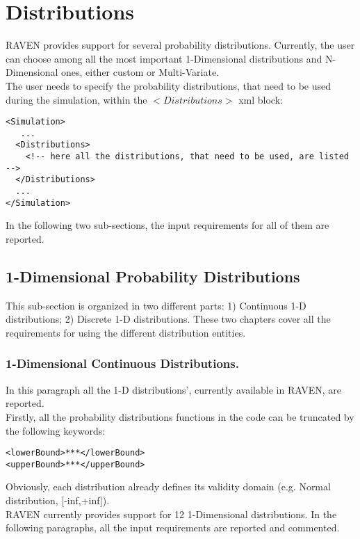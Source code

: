 \section{Distributions \\ \vspace{2 mm}}
\label{sec:distributions}
\newcommand{\distname}[1]{\textbf{#1}}
\newcommand{\distattrib}[1]{\textit{#1}}
RAVEN provides support for several probability distributions. Currently, the user can choose among all the most important 1-Dimensional distributions and N-Dimensional ones, either custom or Multi-Variate.  
\\ The user needs to specify the probability distributions, that need to be used during the simulation, within the $<Distributions>$ xml block:
\begin{lstlisting}[style=XML]
<Simulation>
   ...
  <Distributions>
    <!-- here all the distributions, that need to be used, are listed -->
  </Distributions>
  ...
</Simulation>
\end{lstlisting}
In the following two sub-sections, the input requirements for all of them are reported.
\subsection{1-Dimensional Probability Distributions}
\label{subsec:1dDist}

This sub-section is organized in two different parts: 1) Continuous 1-D distributions; 2) Discrete 1-D distributions. These two chapters cover all the  requirements for using the different distribution entities. 
\subsubsection{1-Dimensional Continuous Distributions.}
\label{subsubsec:1DContinuous}

In this paragraph all the 1-D distributions', currently available in RAVEN, are reported.
\\ Firstly, all the probability distributions functions in the code can be truncated by the following keywords:
\begin{lstlisting}[style=XML]
<lowerBound>***</lowerBound>
<upperBound>***</upperBound>
\end{lstlisting}
Obviously, each distribution already defines its validity domain (e.g. Normal distribution, [-inf,+inf]).
\\ RAVEN currently provides support for 12 1-Dimensional distributions.  In the following paragraphs, all the input requirements are reported and commented.


